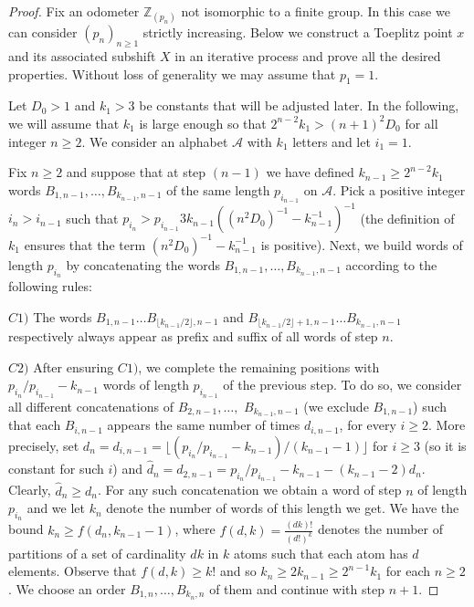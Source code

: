 \documentclass{daj}
\theoremstyle{plain}
\theoremstyle{definition}
\begin{document}
\begin{proof}
	Fix an odometer $\mathbb{Z}_{(p_{n})}$ not isomorphic to a finite group. In this case we can consider $(p_{n})_{n\geq 1}$ strictly increasing. Below we construct a Toeplitz point $x$ and its associated subshift $X$ in an iterative process and prove all the desired properties. Without loss of generality we may assume that $p_{1} =1$.
	
	 Let $D_{0}>1$ and $k_{1}>3$ be  constants that will be adjusted later.  In the following, we will assume that $k_{1}$ is large enough so that $2^{n-2} k_{1} > (n+1)^2D_{0}$ for all integer $n \ge 2$. 
	We consider an alphabet  $\mathcal{A}$ with $k_{1}$ letters   and let $i_{1}=1$.
	
	Fix $n\geq 2$ and suppose that at step $(n-1)$ we have defined $k_{n-1} \ge 2^{n-2} k_{1}$ words 
	$B_{1,n-1},\ldots,B_{k_{n-1},n-1}$ of the same length $p_{i_{n-1}}$ on  $\mathcal{A}$. 
	Pick a positive integer $i_{n}>i_{n-1}$ such that $p_{i_{n}} >  p_{i_{n-1}}  3k_{n-1} ( (n^2 D_{0})^{-1}  - k_{n-1}^{-1})^{-1}$ (the definition of $k_{1}$ ensures
	that the term $(n^2 D_{0})^{-1}  - k_{n-1}^{-1}$ is positive).
	Next, we build words of length $p_{i_{n}}$  by concatenating the words  $B_{1,n-1},\ldots,B_{k_{n-1},n-1}$ according to the following rules:
	\smallskip
	
	\noindent $C1)$  The  words  $B_{1,n-1}\ldots B_{\lfloor k_{n-1}/2 \rfloor,n-1}$ and
	$B_{\lfloor k_{n-1}/2 \rfloor +1 ,n-1} \ldots B_{k_{n-1},n-1}$ respectively always appear as prefix and suffix of all words of step $n$. 
	\smallskip
	
	\noindent $C2)$ After ensuring $C1)$, we complete the remaining positions with $p_{i_{n}}/p_{i_{n-1}}-k_{n-1}$%
	words of length $p_{i_{n-1}}$ of the previous step. To do so, we consider all different concatenations of $B_{2,n-1}, \ldots,$ $B_{k_{n-1},n-1}$ (we exclude $B_{1,n-1}$) such that each  $B_{i,n-1}$ appears the same number of times $d_{i,n-1}$, for every $i \ge 2$. 
	More precisely, set $d_{n}=d_{i,n-1}=\lfloor({p_{i_{n}}}/ {p_{i_{n-1}}}  - k_{n-1})/ (k_{n-1}-1) \rfloor$
	for $i\ge 3$ (so it is constant for such $i$) and $\hat d_{n}=d_{2,n-1} = p_{i_{n}}/p_{i_{n-1}} -k_{n-1} -(k_{n-1}-2)d_{n}$. 
	Clearly, $\hat d_{n} \geq d_{n}$. For any such concatenation we obtain a word of step $n$ of length $p_{i_n}$ and we let $k_{n}$ denote the number of words of this length we get. We have the bound  $k_{n} \ge 
	f(d_{n},k_{n-1}-1)$, where 
	$f(d,k) = \frac{(dk)!}{(d !)^k}$ denotes the number of partitions of a set of cardinality $d k$ in $k$ atoms such that each atom has  $d$ elements. 
	Observe that $f(d,k) \ge k!$ and so $k_{n} \ge   2 k_{n-1} \ge 2^{n-1} k_{1}$ for each $n \ge 2$. 
	We choose an order $B_{1,n}, \ldots, B_{k_{n},n}$ of them and continue with step $n+1$. 
	

\end{proof}
\end{document}
